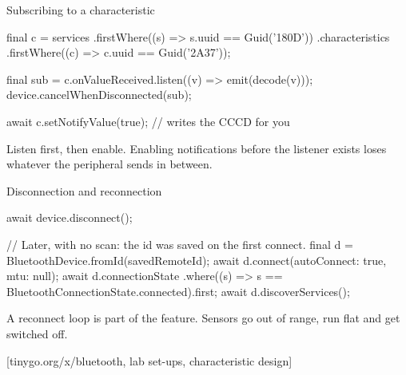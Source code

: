 \documentclass[10pt,aspectratio=169,t]{beamer}
\begin{document}
\begin{frame}[fragile,eyebrow=Flutter]{Subscribing to a characteristic}
  \vskip 1mm
\begin{dart}
final c = services
    .firstWhere((s) => s.uuid == Guid('180D'))
    .characteristics
    .firstWhere((c) => c.uuid == Guid('2A37'));

final sub = c.onValueReceived.listen((v) => emit(decode(v)));
device.cancelWhenDisconnected(sub);

await c.setNotifyValue(true);   // writes the CCCD for you
\end{dart}
  \begin{takeaway}{Listen first, then enable.}
    Enabling notifications before the listener exists loses whatever the peripheral sends in between.
  \end{takeaway}
\end{frame}

\begin{frame}[fragile,eyebrow=Flutter]{Disconnection and reconnection}
  \vskip 1mm
\begin{dart}
await device.disconnect();

// Later, with no scan: the id was saved on the first connect.
final d = BluetoothDevice.fromId(savedRemoteId);
await d.connect(autoConnect: true, mtu: null);
await d.connectionState
    .where((s) => s == BluetoothConnectionState.connected).first;
await d.discoverServices();
\end{dart}
  \begin{takeaway}{A reconnect loop is part of the feature.}
    Sensors go out of range, run flat and get switched off.
  \end{takeaway}
\end{frame}

[tinygo.org/x/bluetooth, lab set-ups, characteristic design]
\end{document}
